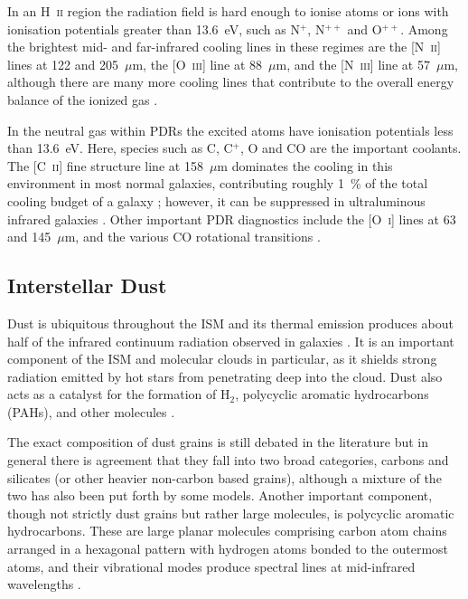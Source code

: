 In an H~\textsc{ii} region the radiation field is hard enough to ionise atoms or ions with ionisation potentials greater than 13.6~eV, such as N$^{+}$, N$^{++}$ and O$^{++}$.  Among the brightest mid- and far-infrared cooling lines in these regimes are the [N~\textsc{ii}] lines at 122 and 205~$\mu$m, the [O~\textsc{iii}] line at 88~$\mu$m, and the [N~\textsc{iii}] line at 57~$\mu$m, although there are many more cooling lines that contribute to the overall energy balance of the ionized gas \citep[e.g. ][]{2001ApJ...553..121H,2012A&A...548A..20C,2012A&A...548A..91L}.

In the neutral gas within PDRs the excited atoms have ionisation potentials less than 13.6~eV.  Here, species such as C, C$^{+}$, O and CO are the important coolants. The [C~\textsc{ii}] fine structure line at 158~$\mu$m dominates the cooling in this environment in most normal galaxies, contributing roughly 1~\% of the total cooling budget of a galaxy \citep{1985ApJ...291..755C,1991ApJ...373..423S,2001ApJ...561..766M}; however, it can be suppressed in ultraluminous infrared galaxies \citep[e.g. ][]{1998ApJ...504L..11L,2003ApJ...594..758L}.  Other important PDR diagnostics include the [O~\textsc{i}] lines at 63 and 145~$\mu$m, and the various CO rotational transitions \citep{2001ApJ...561..766M,2001A&A...375..566N}.

\subsection{Interstellar Dust} \label{dust}
Dust is ubiquitous throughout the ISM and its thermal emission produces about half of the infrared continuum radiation observed in galaxies \citep{2010A&A...518L...1P}.  It is an important component of the ISM and molecular clouds in particular, as it shields strong radiation emitted by hot stars from penetrating deep into the cloud.  Dust also acts as a catalyst for the formation of H$_2$, polycyclic aromatic hydrocarbons (PAHs), and other molecules \citep{2005pcim.book.....T}.

The exact composition of dust grains is still debated in the literature but in general there is agreement that they fall into two broad categories, carbons and silicates (or other heavier non-carbon based grains), although a mixture of the two has also been put forth by some models.  Another important component, though not strictly dust grains but rather large molecules, is polycyclic aromatic hydrocarbons.  These are large planar molecules comprising carbon atom chains arranged in a hexagonal pattern with hydrogen atoms bonded to the outermost atoms, and their vibrational modes produce spectral lines at mid-infrared wavelengths \citep{1985ApJ...290L..25A}.

